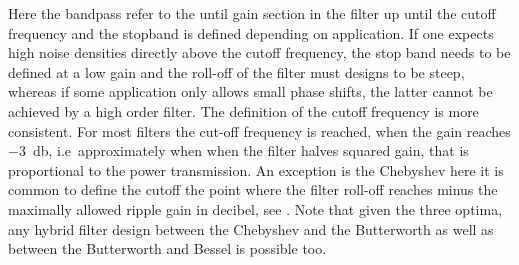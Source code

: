 Here the bandpass refer to the until gain section in the filter up until the cutoff frequency and the stopband is defined depending on application. If one expects high noise densities directly above the cutoff frequency, the stop band needs to be defined at a low gain and the roll-off of the filter must designs to be steep, whereas if some application only allows small phase shifts, the latter cannot be achieved by a high order filter. The definition of the cutoff frequency is more consistent. For most filters the cut-off frequency is reached, when the gain reaches \SI{-3}{\decibel}, i.e\ approximately when when the filter halves squared gain, that is proportional to the power transmission. An exception is the Chebyshev here it is common to define the cutoff the point where the filter roll-off reaches minus the maximally allowed ripple gain in decibel, see .
Note that given the three optima, any hybrid filter design between the Chebyshev and the Butterworth as well as between the Butterworth and Bessel is possible too.

